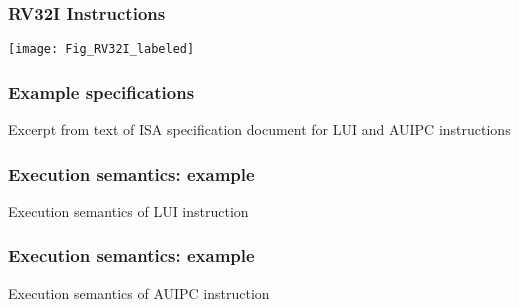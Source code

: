 
\begin{frame}
\frametitle{RV32I Instructions}

\begin{center}
\texttt{[image: Fig\_RV32I\_labeled]}
\end{center}

\end{frame}


\begin{frame}
\frametitle{Example specifications}

Excerpt from text of ISA specification document for LUI and AUIPC instructions

\begin{center}
\end{center}

\end{frame}


\begin{frame}
\frametitle{Execution semantics: example}

Execution semantics of LUI instruction

\vspace{1ex}

\begin{center}
\end{center}

\end{frame}


\begin{frame}
\frametitle{Execution semantics: example}

Execution semantics of AUIPC instruction

\vspace{1ex}

\begin{center}
\end{center}

\end{frame}

